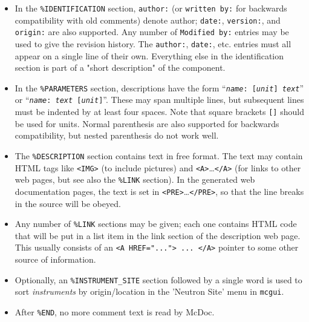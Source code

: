 \begin{itemize}
\item In the \verb+%IDENTIFICATION+
  section, \verb+author:+ (or \verb+written by:+ for backwards
  compatibility with old comments) denote author; \verb+date:+,
  \verb+version:+, and \verb+origin:+ are also supported. Any number of
  \verb+Modified by:+ entries may be used to give the revision history.
  The \verb+author:+, \verb+date:+, etc. entries must all
  appear on a single line of their own. Everything else in the
  identification section is part of a "short description" of the
  component.
\item In the \verb+%PARAMETERS+
  section, descriptions have the form
  \hbox{``\texttt{{\it name\/}:~[{\it unit\/}] {\it text\/}}''}
  or \hbox{``\texttt{{\it name\/}:~{\it text\/} [{\it unit\/}]}''}.
  These may span multiple lines, but subsequent lines must be
  indented by at least four spaces. Note that square brackets \verb+[]+ should
  be used for units. Normal parenthesis are also supported for backwards
  compatibility, but nested parenthesis do not work well.
\item The \verb+%DESCRIPTION+
  section contains text in free format. The text may contain HTML tags
  like \verb+<IMG>+ (to include pictures) and
  \verb+<A>+\ldots\verb+</A>+
  (for links to other web pages, but see also the \verb+%LINK+
  section). In the generated web documentation pages, the text is set in
  \verb+<PRE>+\ldots\verb+</PRE>+, so that the line breaks in the source
  will be obeyed.
\item Any number of \verb+%LINK+
  sections may be given; each one contains HTML code that will be put in
  a list item in the link section of the description web page. This
  usually consists of an \verb+<A HREF="..."> ... </A>+ pointer to some
  other source of information.
\item Optionally, an \verb+%INSTRUMENT_SITE+ section followed by a single word is used to sort \emph{instruments} by origin/location in the 'Neutron Site' menu in \verb+mcgui+.
\item After \verb+%END+, no more comment text is read by McDoc.
\end{itemize}
